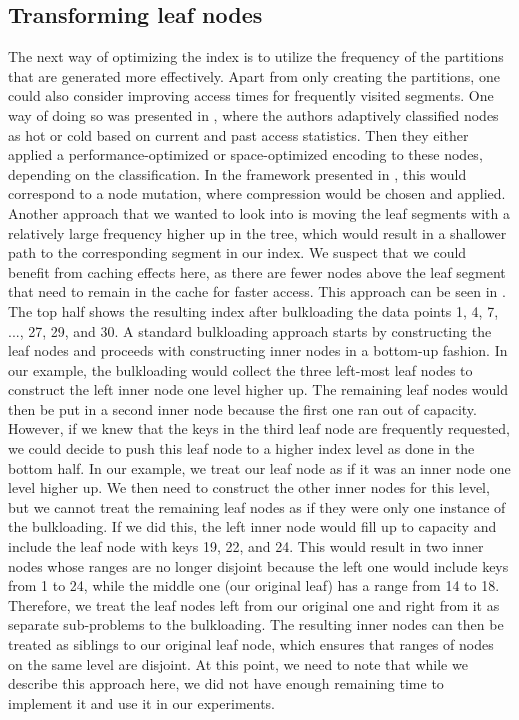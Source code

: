 \subsection{Transforming leaf nodes} \label{sec:leaftransform}
The next way of optimizing the index is to utilize the frequency of the partitions that are generated more effectively. Apart from only creating the partitions, one could also consider improving access times for frequently visited segments. One way of doing so was presented in , where the authors adaptively classified nodes as hot or cold based on current and past access statistics. Then they either applied a performance-optimized or space-optimized encoding to these nodes, depending on the classification. In the framework presented in , this would correspond to a node mutation, where compression would be chosen and applied. Another approach that we wanted to look into is moving the leaf segments with a relatively large frequency higher up in the tree, which would result in a shallower path to the corresponding segment in our index. We suspect that we could benefit from caching effects here, as there are fewer nodes above the leaf segment that need to remain in the cache for faster access. This approach can be seen in . The top half shows the resulting index after bulkloading the data points 1, 4, 7, ..., 27, 29, and 30. A standard bulkloading approach starts by constructing the leaf nodes and proceeds with constructing inner nodes in a bottom-up fashion. In our example, the bulkloading would collect the three left-most leaf nodes to construct the left inner node one level higher up. The remaining leaf nodes would then be put in a second inner node because the first one ran out of capacity. However, if we knew that the keys in the third leaf node are frequently requested, we could decide to push this leaf node to a higher index level as done in the bottom half. In our example, we treat our leaf node as if it was an inner node one level higher up. We then need to construct the other inner nodes for this level, but we cannot treat the remaining leaf nodes as if they were only one instance of the bulkloading. If we did this, the left inner node would fill up to capacity and include the leaf node with keys 19, 22, and 24. This would result in two inner nodes whose ranges are no longer disjoint because the left one would include keys from 1 to 24, while the middle one (our original leaf) has a range from 14 to 18. Therefore, we treat the leaf nodes left from our original one and right from it as separate sub-problems to the bulkloading. The resulting inner nodes can then be treated as siblings to our original leaf node, which ensures that ranges of nodes on the same level are disjoint. At this point, we need to note that while we describe this approach here, we did not have enough remaining time to implement it and use it in our experiments.

